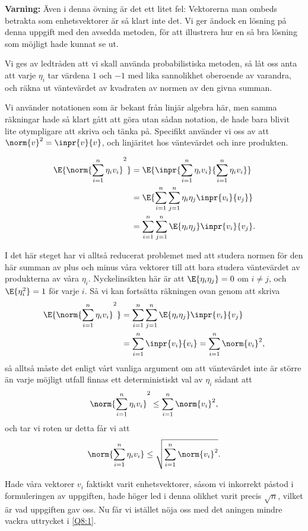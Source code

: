 \documentclass[nobib]{tufte-handout}
\begin{document}
{\large \textbf{Varning:}} Även i denna övning är det ett litet fel: Vektorerna man ombeds betrakta som enhetsvektorer är så klart inte det. Vi ger ändock en lösning på denna uppgift med den avsedda metoden, för att illustrera hur en så bra lösning som möjligt hade kunnat se ut.

Vi ges av ledtråden att vi skall använda probabilistiska metoden, så låt oss anta att varje $\eta_i$ tar värdena $1$ och $-1$ med lika sannolikhet oberoende av varandra, och räkna ut väntevärdet av kvadraten av normen av den givna summan.

Vi använder notationen som är bekant från linjär algebra här, men samma räkningar hade så klart gått att göra utan sådan notation, de hade bara blivit lite otympligare att skriva och tänka på. Specifikt använder vi oss av att $\norm{v}^2 = \inpr{v}{v}$, och linjäritet hos väntevärdet och inre produkten.

\begin{align*}
  \E{\norm{\sum_{i=1}^{n} \eta_i v_i}^2} &= \E{\inpr{\sum_{i=1}^{n} \eta_i v_i}{\sum_{i=1}^{n} \eta_i v_i}}\\
  &= \E{\sum_{i = 1}^{n} \sum_{j = 1}^{n} \eta_i \eta_j \inpr{v_i}{v_j}}\\
  &= \sum_{i = 1}^{n} \sum_{j = 1}^{n} \E{\eta_i \eta_j} \inpr{v_i}{v_j}.
\end{align*}

I det här steget har vi alltså reducerat problemet med att studera normen för den här summan av plus och minus våra vektorer till att bara studera väntevärdet av produkterna av våra $\eta_i$. Nyckelinsikten här är att $\E{\eta_i \eta_j} = 0$ om $i \neq j$, och $\E{\eta_i^2} = 1$ för varje $i$. Så vi kan fortsätta räkningen ovan genom att skriva
\begin{align*}
  \E{\norm{\sum_{i=1}^{n} \eta_i v_i}^2} &= \sum_{i = 1}^{n} \sum_{j = 1}^{n} \E{\eta_i \eta_j} \inpr{v_i}{v_j}\\
  &= \sum_{i=1}^{n} \inpr{v_i}{v_i} = \sum_{i=1}^{n} \norm{v_i}^2,
\end{align*}
så alltså måste det enligt vårt vanliga argument om att väntevärdet inte är större än varje möjligt utfall finnas ett deterministiskt val av $\eta_i$ sådant att
$$\norm{\sum_{i=1}^{n} \eta_i v_i}^2 \leq \sum_{i=1}^{n} \norm{v_i}^2,$$
och tar vi roten ur detta får vi att
\begin{equation}\label{Q8:1}
  \norm{\sum_{i=1}^{n} \eta_i v_i} \leq \sqrt{\sum_{i=1}^{n} \norm{v_i}^2}.
\end{equation}

Hade våra vektorer $v_i$ faktiskt varit enhetsvektorer, såsom vi inkorrekt påstod i formuleringen av uppgiften, hade höger led i denna olikhet varit precis $\sqrt{n}$, vilket är vad uppgiften gav oss. Nu får vi istället nöja oss med det aningen mindre vackra uttrycket i \eqref{Q8:1}.

%
%
\end{document}
